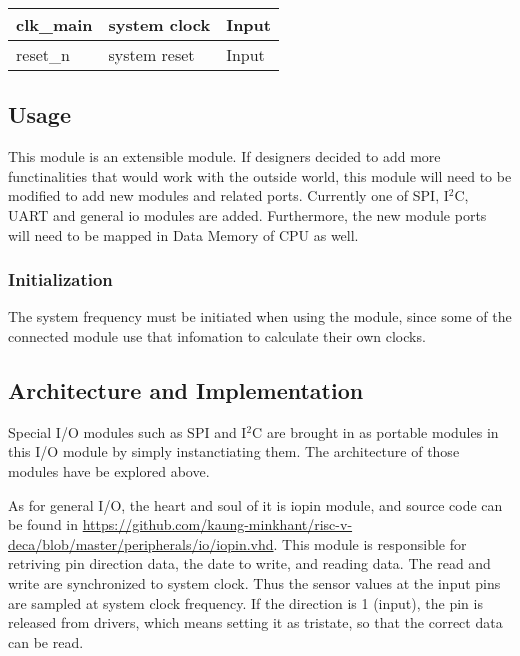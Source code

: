 \begin{table}[!h]
{\begin{tabular}{|ll|l|l|}
            \multicolumn{2}{|l|}{clk\_main}                    & system clock                               & Input                                                                                   \\ \hline
            \multicolumn{2}{|l|}{reset\_n}                     & system reset                               & Input                                                                                   \\ \hline
        \end{tabular}
    }
\end{table}

\newpage
\subsection{Usage}
This module is an extensible module. If designers decided to add more functinalities that would work with the outside world,
this module will need to be modified to add new modules and related ports.
Currently one of SPI, I$^2$C, UART and general io modules are added.
Furthermore, the new module ports will need to be mapped in Data Memory of CPU as well.
\subsubsection{Initialization}
The system frequency must be initiated when using the module, since some of the connected module use that infomation to calculate their own clocks.

\newpage
\subsection{Architecture and Implementation}
Special I/O modules such as SPI and I$^2$C are brought in as portable modules in this I/O module by simply instanctiating them.
The architecture of those modules have be explored above.

As for general I/O, the heart and soul of it is iopin module, and source code can be found in \url{https://github.com/kaung-minkhant/risc-v-deca/blob/master/peripherals/io/iopin.vhd}.
This module is responsible for retriving pin direction data, the date to write, and reading data.
The read and write are synchronized to system clock.
Thus the sensor values at the input pins are sampled at system clock frequency.
If the direction is 1 (input), the pin is released from drivers, which means setting it as tristate, so that the correct data can be read. 


